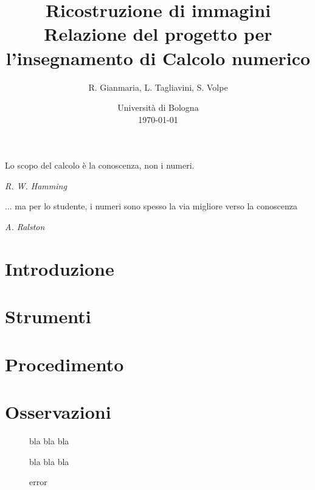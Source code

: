 \documentclass[a4paper]{article}
\title{Ricostruzione di immagini \\ \large Relazione del progetto per l'insegnamento di Calcolo numerico}
\author{
  R. Gianmaria,
  L. Tagliavini,
  S. Volpe
}
\date{
	Universit\`a di Bologna \\
  \today
}
\begin{document}
\maketitle
\thispagestyle{empty}

\epigraph{Lo scopo del calcolo è la conoscenza, non i numeri.}
{\textit{R. W. Hamming}}
\epigraph{... ma per lo studente, i numeri sono spesso la via migliore verso la
conoscenza}
{\textit{A. Ralston}}

\section{Introduzione}

\section{Strumenti}

\section{Procedimento}

\section{Osservazioni}

\begin{figure}
   \begin{center}
       \vspace*{-1.1in}
       \centerline{\scalebox{1.3}{}}
   \end{center}
   \vspace*{-0.2in}
   \caption{bla bla bla}
\end{figure}

\begin{figure}
    \begin{center}
        \scalebox{0.65}{}
    \end{center}
    \begin{center}
        \scalebox{0.65}{}
    \end{center}
    \begin{center}
      \scalebox{0.65}{}
    \end{center}
    \caption{bla bla bla}
\end{figure}

\begin{figure}
    \begin{center}
        \scalebox{0.65}{}
    \end{center}
    \caption{error}
\end{figure}
\end{document}
